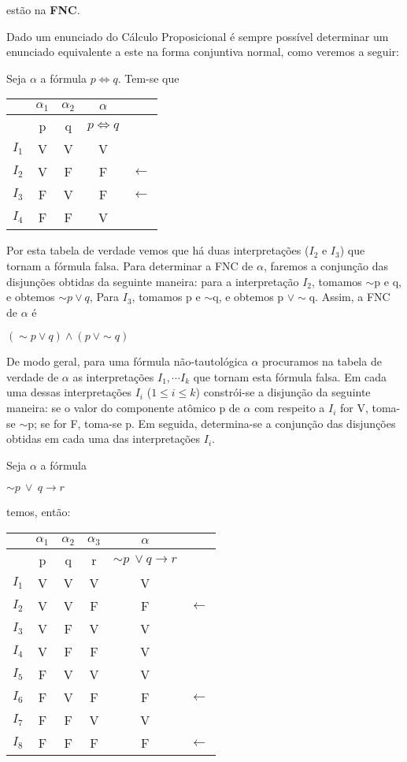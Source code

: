 estão na \textbf{FNC}.

Dado um enunciado do Cálculo Proposicional é sempre possível determinar um enunciado equivalente a este na forma conjuntiva normal, como veremos a seguir:

\begin{exemplo}
    Seja $\alpha$ a fórmula $p \iff q$.
    Tem-se que
\end{exemplo}

\begin{tabular}{c | c c c l}
    & $\alpha_1$ & $\alpha_2$ & $\alpha$ & \\ \hline
    & p & q & $p \iff q$ & \\
    $I_1$ & V & V & V & \\
    $I_2$ & V & F & F & $\longleftarrow$ \\
    $I_3$ & F & V & F & $\longleftarrow$ \\
    $I_4$ & F & F & V &
\end{tabular}

\bigskip
Por esta tabela de verdade vemos que há duas interpretações ($I_2$ e $I_3$) que tornam a fórmula falsa.
Para determinar a FNC de $\alpha$, faremos a conjunção das disjunções obtidas da seguinte maneira: para a interpretação $I_2$, tomamos $\sim$p e q, e obtemos $\sim p \lor q$, Para $I_3$, tomamos p e $\sim$q, e obtemos p $\lor \sim$q.
Assim, a FNC de $\alpha$ é

\centerline{$(\sim p \lor q) \land (p\ \lor \sim q)$}

De modo geral, para uma fórmula não-tautológica $\alpha$ procuramos na tabela de verdade de $\alpha$ as interpretações $I_1, \cdots I_k$ que tornam esta fórmula falsa.
Em cada uma dessas interpretações $I_i$ ($1 \leq i \leq k$) constrói-se a disjunção da seguinte maneira: se o valor do componente atômico p de $\alpha$ com respeito a $I_i$ for V, toma-se $\sim$p; se for F, toma-se p.
Em seguida, determina-se a conjunção das disjunções obtidas em cada uma das interpretações $I_i$.

\begin{exemplo}
    Seja $\alpha$ a fórmula

    \centerline{$\sim p\ \lor\ q \to r$}
\end{exemplo}

temos, então:

\bigskip
\begin{tabular}{c | c c c c l}
    & $\alpha_1$ & $\alpha_2$ & $\alpha_3$ & $\alpha$ & \\ \hline
    & p & q & r & $\sim p\ \lor q \to r$& \\
    $I_1$ & V & V & V & V & \\
    $I_2$ & V & V & F & F & $\longleftarrow$ \\
    $I_3$ & V & F & V & V & \\
    $I_4$ & V & F & F & V & \\
    $I_5$ & F & V & V & V & \\
    $I_6$ & F & V & F & F & $\longleftarrow$ \\
    $I_7$ & F & F & V & V & \\
    $I_8$ & F & F & F & F & $\longleftarrow$
\end{tabular}
\bigskip

